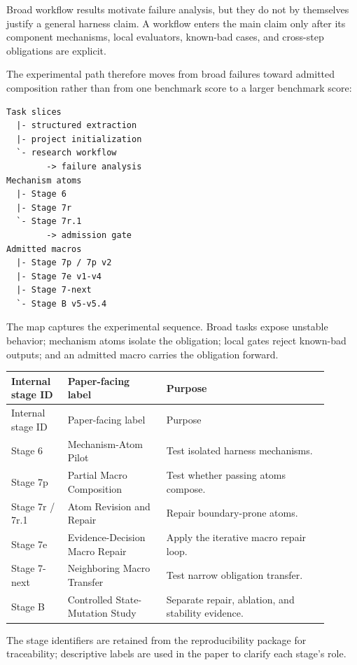 \documentclass[11pt]{article}
\begin{document}
Broad workflow results motivate failure analysis, but they do not by themselves justify a general harness claim. A workflow enters the main claim only after its component mechanisms, local evaluators, known-bad cases, and cross-step obligations are explicit.

The experimental path therefore moves from broad failures toward admitted composition rather than from one benchmark score to a larger benchmark score:

\begin{verbatim}
Task slices
  |- structured extraction
  |- project initialization
  `- research workflow
        -> failure analysis
Mechanism atoms
  |- Stage 6
  |- Stage 7r
  `- Stage 7r.1
        -> admission gate
Admitted macros
  |- Stage 7p / 7p v2
  |- Stage 7e v1-v4
  |- Stage 7-next
  `- Stage B v5-v5.4
\end{verbatim}

The map captures the experimental sequence. Broad tasks expose unstable behavior; mechanism atoms isolate the obligation; local gates reject known-bad outputs; and an admitted macro carries the obligation forward.

{\small
\setlength{\tabcolsep}{3pt}
\begin{longtable}{>{\raggedright\arraybackslash}p{0.160\linewidth}>{\raggedright\arraybackslash}p{0.280\linewidth}>{\raggedright\arraybackslash}p{0.460\linewidth}}
\toprule
Internal stage ID & Paper-facing label & Purpose \\
\midrule
\endfirsthead
\toprule
Internal stage ID & Paper-facing label & Purpose \\
\midrule
\endhead
Stage 6 & Mechanism-Atom Pilot & Test isolated harness mechanisms. \\
Stage 7p & Partial Macro Composition & Test whether passing atoms compose. \\
Stage 7r / 7r.1 & Atom Revision and Repair & Repair boundary-prone atoms. \\
Stage 7e & Evidence-Decision Macro Repair & Apply the iterative macro repair loop. \\
Stage 7-next & Neighboring Macro Transfer & Test narrow obligation transfer. \\
Stage B & Controlled State-Mutation Study & Separate repair, ablation, and stability evidence. \\
\bottomrule
\end{longtable}
}

The stage identifiers are retained from the reproducibility package for traceability; descriptive labels are used in the paper to clarify each stage's role.
\end{document}
